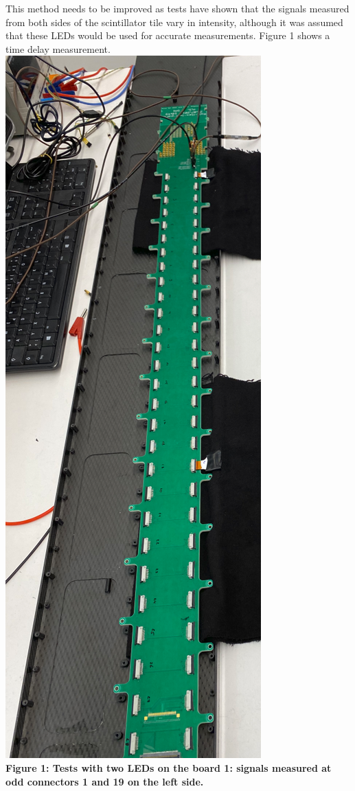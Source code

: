\documentclass[../BTOF_summary.tex]{subfiles}
\begin{document}
This method needs to be improved as tests have shown that the signals measured from both sides of the scintillator tile vary in intensity, although it was assumed that these LEDs would be used for accurate measurements.
Figure 1 shows a time delay measurement.
\\
\includegraphics[scale=0.2, angle =270]{Pictures/pic1.png}
\\
\textbf{Figure 1: Tests with two LEDs on the board 1: signals measured at odd connectors 1 and 19 on the left side.}
\\
\end{document}
